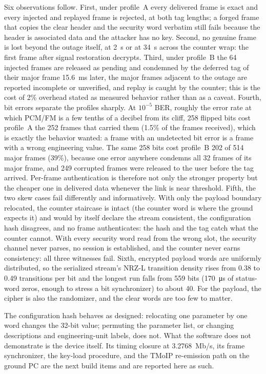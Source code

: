 \documentclass[12pt,letterpaper]{article}
\begin{document}
Six observations follow. First, under profile~A every delivered frame is exact and every
injected and replayed frame is rejected, at both tag lengths; a forged frame that copies
the clear header and the security word verbatim still fails because the header is
associated data and the attacker has no key. Second, no genuine frame is lost beyond the
outage itself, at 2~s or at 34~s across the counter wrap: the first frame after signal
restoration decrypts. Third, under profile~B the 64 injected frames are released as pending
and condemned by the deferred tag of their major frame 15.6~ms later, the major frames
adjacent to the outage are reported incomplete or unverified, and replay is caught by the
counter; this is the cost of 2\% overhead stated as measured behavior rather than as a
caveat. Fourth, bit errors separate the profiles sharply. At $10^{-5}$ BER, roughly the
error rate at which PCM/FM is a few tenths of a decibel from its cliff, 258 flipped bits
cost profile~A the 252 frames that carried them (1.5\% of the frames received), which is
exactly the behavior wanted: a frame with an undetected bit error is a frame with a wrong
engineering value. The same 258 bits cost profile~B 202 of 514 major frames (39\%), because
one error anywhere condemns all 32 frames of its major frame, and 249 corrupted frames were
released to the user before the tag arrived. Per-frame authentication is therefore not only
the stronger property but the cheaper one in delivered data whenever the link is near
threshold. Fifth, the two skew cases fail differently and informatively. With only the
payload boundary relocated, the counter staircase is intact (the counter word is where the
ground expects it) and would by itself declare the stream consistent, the configuration
hash disagrees, and no frame authenticates: the hash and the tag catch what the counter
cannot. With every security word read from the wrong slot, the security channel never
parses, no session is established, and the counter never earns consistency: all three
witnesses fail. Sixth, encrypted payload words are uniformly distributed, so the serialized
stream's NRZ-L transition density rises from 0.38 to 0.49 transitions per bit and the
longest run falls from 559 bits (170~\si{\micro\second} of status-word zeros, enough to
stress a bit synchronizer) to about 40. For the payload, the cipher is also the randomizer,
and the clear words are too few to matter.

The configuration hash behaves as designed: relocating one parameter by one word changes
the 32-bit value; permuting the parameter list, or changing descriptions and
engineering-unit labels, does not. What the software does not demonstrate is the device
itself. Its timing closure at 3.2768~Mb/s, its frame synchronizer, the key-load procedure,
and the TMoIP re-emission path on the ground PC are the next build items and are reported
here as such.
\end{document}
